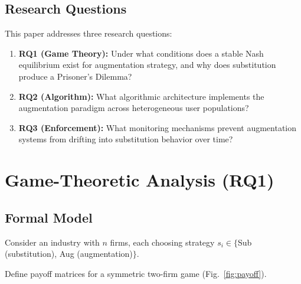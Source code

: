 \documentclass[conference]{IEEEtran}
\begin{document}
\subsection{Research Questions}

This paper addresses three research questions:

\begin{enumerate}
  \item \textbf{RQ1 (Game Theory):} Under what conditions
        does a stable Nash equilibrium exist for augmentation
        strategy, and why does substitution produce a
        Prisoner's Dilemma?
  \item \textbf{RQ2 (Algorithm):} What algorithmic
        architecture implements the augmentation paradigm
        across heterogeneous user populations?
  \item \textbf{RQ3 (Enforcement):} What monitoring
        mechanisms prevent augmentation systems from
        drifting into substitution behavior over time?
\end{enumerate}

\section{Game-Theoretic Analysis (RQ1)}

\subsection{Formal Model}

Consider an industry with $n$ firms, each choosing
strategy $s_i \in \{$Sub (substitution), Aug (augmentation)$\}$.

Define payoff matrices for a symmetric two-firm game
(Fig.~\ref{fig:payoff}).
\end{document}
